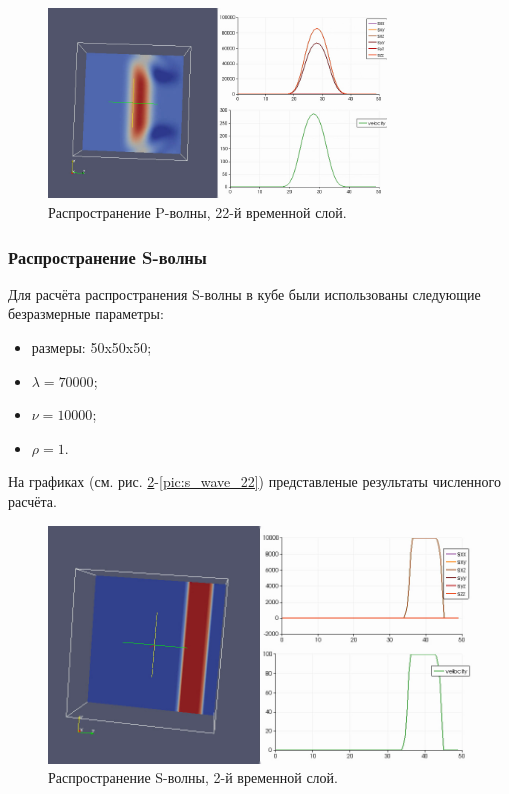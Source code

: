 \begin{figure}[htp]
\centering
\includegraphics[width=0.8\textwidth]{png/p-wave-propogation-3d-022.png}
\caption{Распространение P-волны, 22-й временной слой.}
\label{pic:p_wave_22}
\end{figure}
\subsubsection{Распространение S-волны}
Для расчёта распространения S-волны в кубе были использованы следующие
безразмерные параметры: 
\begin{itemize}
\item размеры: 50x50x50;
\item $\lambda=70000$;
\item $\nu=10000$;
\item $\rho=1$.
\end{itemize}
На графиках (см. рис.
\ref{pic:s_wave_2}-\ref{pic:s_wave_22}) представленые результаты численного расчёта.
\begin{figure}[htp]
\centering
\includegraphics[width=\textwidth]{png/s-wave-propogation-3d-002.png}
\caption{Распространение S-волны, 2-й временной слой.}
\label{pic:s_wave_2}
\end{figure}
